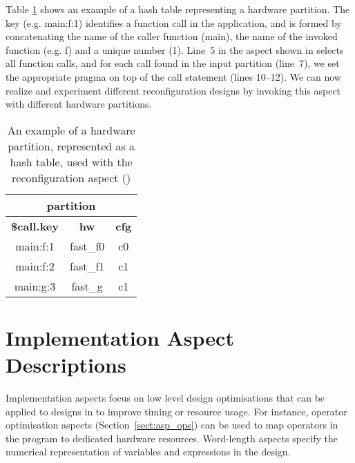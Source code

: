 Table \ref{fig:aspect-hash} shows an example of a hash table
representing a hardware partition. The key (e.g. main:f:1) identifies
a function call in the application, and is formed by concatenating the
name of the caller function (main), the name of the invoked function
(e.g. f) and a unique number (1).  Line~5 in the aspect shown in
 selects all function calls, and for each
call found in the input partition (line~7), we set the appropriate
pragma on top of the call statement (lines 10--12). We can now realize
and experiment different reconfiguration designs by invoking this
aspect with different hardware partitions.


\begin{table}[!h]

\centering
\begin{tabular}{c|c|c}
\hline
\multicolumn{3}{c}{\bf{partition}} \\
\hline
\bf{\$call.key} & \bf{hw} & \bf{cfg}  \\
\hline
main:f:1 & fast\_f0 & c0 \\
main:f:2 & fast\_f1 & c1 \\
main:g:3 & fast\_g & c1 \\
\hline
\end{tabular}
\caption{An example of a hardware partition, represented as a hash
  table, used with the reconfiguration aspect
  ()}
\label{fig:aspect-hash}
\end{table}
\begin{comment}
\subsection{Feedback Aspects}
Used to complement predicted model data (such as resource usage) from
back-end compilation reports or execution of automated performance
test suites. This improves estimates (e.g. for reconfiguration cost /
performance improvement etc.)
\end{comment}

\section{Implementation Aspect Descriptions}

Implementation aspects focus on
low level design optimisations that can be applied to designs in
\FAST{} to improve timing or resource usage. For instance, operator
optimisation aspects (Section~\ref{sect:asp_ops}) can be used to map
operators in the program to dedicated hardware resources. Word-length
aspects specify the numerical representation of variables and
expressions in the design.




